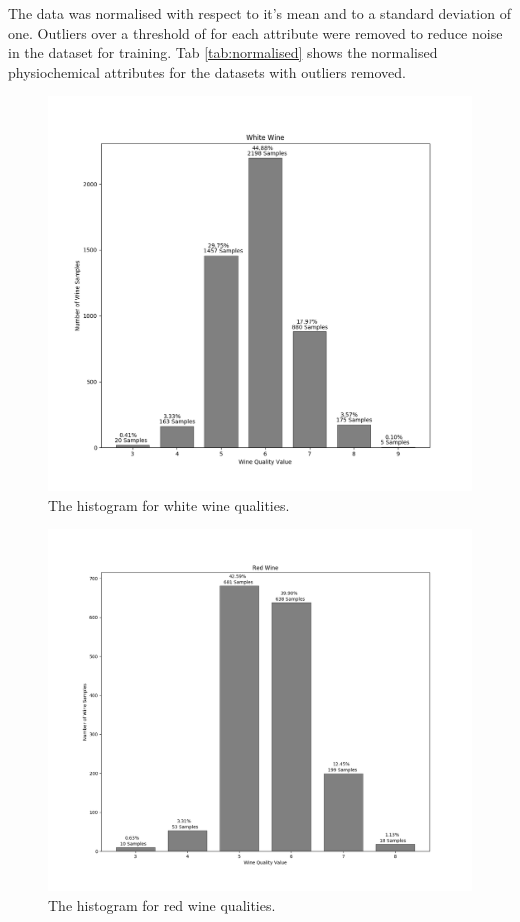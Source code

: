 \documentclass[10pt,twocolumn,letterpaper]{article}
\begin{document}
The data was normalised with respect to it's mean and to a standard deviation of one. Outliers over a threshold of for each attribute were removed to reduce noise in the dataset for training. Tab \ref{tab:normalised} shows the normalised physiochemical attributes for the datasets with outliers removed. 

\begin{figure}[h]
	\begin{center}
		\includegraphics[width=0.8\linewidth]{img/white_samples.png}
	\end{center}
	\caption{The histogram for white wine qualities.}
	\label{fig:histwhite}
\end{figure}

\begin{figure}[h]
	\begin{center}
		\includegraphics[width=0.8\linewidth]{img/red_samples.png}
	\end{center}
	\caption{The histogram for red wine qualities.}
	\label{fig:histred}
\end{figure}
\end{document}
